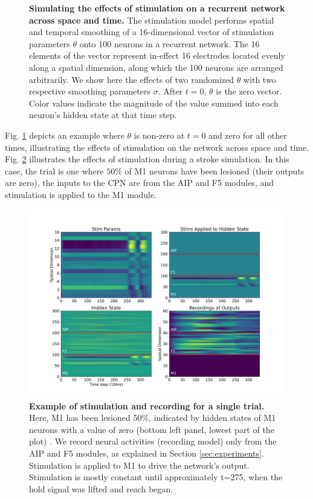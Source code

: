 \documentclass[12pt]{iopart}
\begin{document}
\begin{figure}[h]
	\caption{\textbf{Simulating the effects of stimulation on a recurrent network across space and time.} The stimulation model performs spatial and temporal smoothing of a 16-dimensional
	         vector of stimulation parameters $\theta$ onto 100 neurons in a recurrent network.
	         The 16 elements of the vector represent in-effect 16 electrodes located
	         evenly along a spatial dimension, along which the 100 neurons are arranged
	         arbitrarily. We show here the effects of two randomized $\theta$ with two respective smoothing
	         parameters $\sigma$. After $t=0$,
		     $\theta$ is the zero vector. Color values indicate the magnitude of the value summed into
		     each neuron's hidden state at that time step. }
	\label{fig:stim_single}
\end{figure}

Fig. \ref{fig:stim_single} depicts an example where
$\theta$ is non-zero at $t=0$ and zero for all other times, illustrating the effects of 
stimulation on the network across space and time.  Fig. \ref{fig:stim_and_obs} illustrates the
effects of stimulation during a stroke simulation. In this case, the trial is one where $50\%$
of M1 neurons have been  lesioned (their outputs are zero), the inputs to the CPN are from the
AIP and F5 modules, and stimulation is applied to the M1 module. 

\begin{figure}[h]
	\centering
	\includegraphics[width=\textwidth]{stim_and_obs.png}
	\caption{\textbf{Example of stimulation and recording for a single trial.} Here, M1
	has been lesioned 50\%, indicated by hidden states of M1 neurons with a value of zero (bottom
	left panel, lowest part of the plot) . We record neural activities (recording model) only
	from the AIP and F5 modules, as explained in Section \ref{sec:experiments}. Stimulation is applied
	to M1 to drive the network's output. Stimulation is mostly constant until approximately t=275,
	when the hold signal was lifted and reach began.}
	\label{fig:stim_and_obs}
\end{figure}
\end{document}
